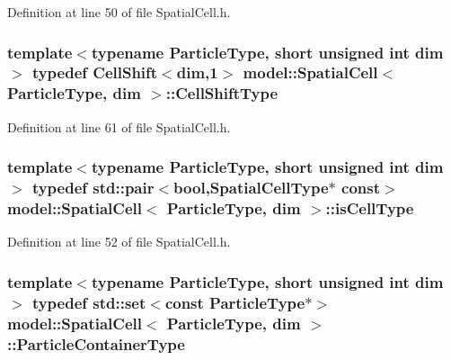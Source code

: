 Definition at line 50 of file Spatial\+Cell.\+h.

\hypertarget{structmodel_1_1_spatial_cell_a1483cea20eafc66b70817694ee55d579}{}
\subsubsection[{Cell\+Shift\+Type}]{\setlength{\rightskip}{0pt plus 5cm}template$<$typename Particle\+Type, short unsigned int dim$>$ typedef {\bf Cell\+Shift}$<${\bf dim},1$>$ {\bf model\+::\+Spatial\+Cell}$<$ Particle\+Type, {\bf dim} $>$\+::{\bf Cell\+Shift\+Type}}\label{structmodel_1_1_spatial_cell_a1483cea20eafc66b70817694ee55d579}


Definition at line 61 of file Spatial\+Cell.\+h.

\hypertarget{structmodel_1_1_spatial_cell_aca247866eb0d2f81722f76d5ea238f8b}{}
\subsubsection[{is\+Cell\+Type}]{\setlength{\rightskip}{0pt plus 5cm}template$<$typename Particle\+Type, short unsigned int dim$>$ typedef std\+::pair$<$bool,{\bf Spatial\+Cell\+Type}$\ast$ const$>$ {\bf model\+::\+Spatial\+Cell}$<$ Particle\+Type, {\bf dim} $>$\+::{\bf is\+Cell\+Type}}\label{structmodel_1_1_spatial_cell_aca247866eb0d2f81722f76d5ea238f8b}


Definition at line 52 of file Spatial\+Cell.\+h.

\hypertarget{structmodel_1_1_spatial_cell_af69747431f1a63b915132ca461175826}{}
\subsubsection[{Particle\+Container\+Type}]{\setlength{\rightskip}{0pt plus 5cm}template$<$typename Particle\+Type, short unsigned int dim$>$ typedef {\bf std\+::set}$<$const Particle\+Type$\ast$$>$ {\bf model\+::\+Spatial\+Cell}$<$ Particle\+Type, {\bf dim} $>$\+::{\bf Particle\+Container\+Type}}\label{structmodel_1_1_spatial_cell_af69747431f1a63b915132ca461175826}


